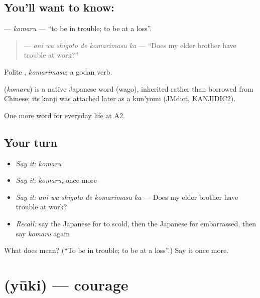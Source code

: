 \subsection*{You'll want to know: }
\textbf{} — \emph{komaru} — \textquotedblleft{}to be in trouble; to be at a loss\textquotedblright{}.

\begin{quote}
\textbf{  } — \emph{ani wa shigoto de komarimasu ka} — \textquotedblleft{}Does my elder brother have trouble at work?\textquotedblright{}
\end{quote}

Polite \textbf{}, \emph{komarimasu}; a godan verb.

\begin{cousinweb}
\textbf{} (\emph{komaru}) is a native Japanese word (wago), inherited rather than borrowed from Chinese; its kanji was attached later as a kun'yomi (JMdict, KANJIDIC2).
\end{cousinweb}

\begin{grammarlens}[title={What you've built}]
One more word for everyday life at A2.
\end{grammarlens}

\subsection*{Your turn}
\begin{itemize}
\raggedright
  \item \emph{Say it:} \emph{komaru}
  \item \emph{Say it:} \emph{komaru}, once more
  \item \emph{Say it:} \emph{ani wa shigoto de komarimasu ka} — Does my elder brother have trouble at work?
  \item \emph{Recall:} say the Japanese for to scold, then the Japanese for embarrassed, then say \emph{komaru} again
\end{itemize}

\begin{tcolorbox}[breakable,colback=teal!4,colframe=teal!35!black,title={Before you move on}]
What does  mean? (\textquotedblleft{}To be in trouble; to be at a loss\textquotedblright{}.) Say it once more.
\end{tcolorbox}
\section[\texorpdfstring{\ja{ゆうき} (yūki)}{ゆうき (yūki)}]{ (yūki) — courage}

